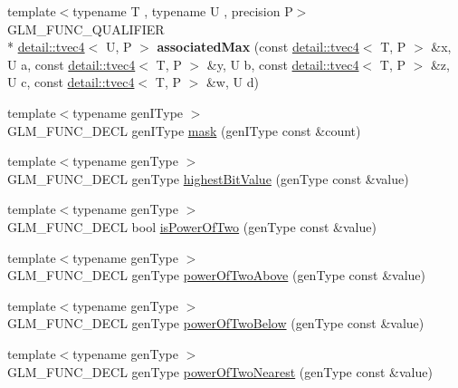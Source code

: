 \begin{DoxyCompactItemize}
\item 
\hypertarget{namespaceglm_ae638f016094457c09c9166d1f03f5a5f}{{\footnotesize template$<$typename T , typename U , precision P$>$ }\\G\-L\-M\-\_\-\-F\-U\-N\-C\-\_\-\-Q\-U\-A\-L\-I\-F\-I\-E\-R \\*
\hyperlink{structglm_1_1detail_1_1tvec4}{detail\-::tvec4}$<$ U, P $>$ {\bfseries associated\-Max} (const \hyperlink{structglm_1_1detail_1_1tvec4}{detail\-::tvec4}$<$ T, P $>$ \&x, U a, const \hyperlink{structglm_1_1detail_1_1tvec4}{detail\-::tvec4}$<$ T, P $>$ \&y, U b, const \hyperlink{structglm_1_1detail_1_1tvec4}{detail\-::tvec4}$<$ T, P $>$ \&z, U c, const \hyperlink{structglm_1_1detail_1_1tvec4}{detail\-::tvec4}$<$ T, P $>$ \&w, U d)}\label{namespaceglm_ae638f016094457c09c9166d1f03f5a5f}

\item 
{\footnotesize template$<$typename gen\-I\-Type $>$ }\\G\-L\-M\-\_\-\-F\-U\-N\-C\-\_\-\-D\-E\-C\-L gen\-I\-Type \hyperlink{group__gtx__bit_ga79f1482a09c91f785e7e0ea8aed2b20e}{mask} (gen\-I\-Type const \&count)
\item 
{\footnotesize template$<$typename gen\-Type $>$ }\\G\-L\-M\-\_\-\-F\-U\-N\-C\-\_\-\-D\-E\-C\-L gen\-Type \hyperlink{group__gtx__bit_ga9621840252c293918780bc3890374b86}{highest\-Bit\-Value} (gen\-Type const \&value)
\item 
{\footnotesize template$<$typename gen\-Type $>$ }\\G\-L\-M\-\_\-\-F\-U\-N\-C\-\_\-\-D\-E\-C\-L bool \hyperlink{group__gtx__bit_ga5ddca7546d8be35992eedd3411842545}{is\-Power\-Of\-Two} (gen\-Type const \&value)
\item 
{\footnotesize template$<$typename gen\-Type $>$ }\\G\-L\-M\-\_\-\-F\-U\-N\-C\-\_\-\-D\-E\-C\-L gen\-Type \hyperlink{group__gtx__bit_gaa49786cf3f8a1f65de6e70b6088a811e}{power\-Of\-Two\-Above} (gen\-Type const \&value)
\item 
{\footnotesize template$<$typename gen\-Type $>$ }\\G\-L\-M\-\_\-\-F\-U\-N\-C\-\_\-\-D\-E\-C\-L gen\-Type \hyperlink{group__gtx__bit_gaeceaea338213cbff7a275460e35e8d0c}{power\-Of\-Two\-Below} (gen\-Type const \&value)
\item 
{\footnotesize template$<$typename gen\-Type $>$ }\\G\-L\-M\-\_\-\-F\-U\-N\-C\-\_\-\-D\-E\-C\-L gen\-Type \hyperlink{group__gtx__bit_ga9e68299f4ca0cd6674efbee62d425b95}{power\-Of\-Two\-Nearest} (gen\-Type const \&value)

\end{DoxyCompactItemize}
